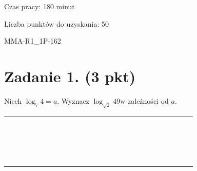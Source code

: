 \documentclass[10pt]{article}
\begin{document}
Czas pracy: 180 minut

Liczba punktów do uzyskania: 50

MMA-R1\_1P-162

\section*{Zadanie 1. (3 pkt)}
Niech \(\log _{7} 4=a\). Wyznacz \(\log _{\sqrt{2}} 49 \mathrm{w}\) zależności od \(a\).

\begin{center}
\begin{tabular}{|c|c|c|c|c|c|c|c|c|c|c|c|c|c|c|c|c|c|c|c|c|c|c|}
\hline
 &  &  &  &  &  &  &  &  &  &  &  &  &  &  &  &  &  &  &  &  &  &  \\
\hline
 &  &  &  &  &  &  &  &  &  &  &  &  &  &  &  &  &  &  &  &  &  &  \\
\hline
 &  &  &  &  &  &  &  &  &  &  &  &  &  &  &  &  &  &  &  &  &  &  \\
\hline
 &  &  &  &  &  &  &  &  &  &  &  &  &  &  &  &  &  &  &  &  &  &  \\
\hline
 &  &  &  &  &  &  &  &  &  &  &  &  &  &  &  &  &  &  &  &  &  &  \\
\hline
 &  &  &  &  &  &  &  &  &  &  &  &  &  &  &  &  &  &  &  &  &  &  \\
\hline
 &  &  &  &  &  &  &  &  &  &  &  &  &  &  &  &  &  &  &  &  &  &  \\
\hline
 &  &  &  &  &  &  &  &  &  &  &  &  &  &  &  &  &  &  &  &  &  &  \\
\hline
 &  &  &  &  &  &  &  &  &  &  &  &  &  &  &  &  &  &  &  &  &  &  \\
\hline
 &  &  &  &  &  &  &  &  &  &  &  &  &  &  &  &  &  &  &  &  &  &  \\
\hline
 &  &  &  &  &  &  &  &  &  &  &  &  &  &  &  &  &  &  &  &  &  &  \\
\hline
 &  &  &  &  &  &  &  &  &  &  &  &  &  &  &  &  &  &  &  &  &  &  \\
\hline
 &  &  &  &  &  &  &  &  &  &  &  &  &  &  &  &  &  &  &  &  &  &  \\
\hline
 &  &  &  &  &  &  &  &  &  &  &  &  &  &  &  &  &  &  &  &  &  &  \\
\hline
 &  &  &  &  &  &  &  &  &  &  &  &  &  &  &  &  &  &  &  &  &  &  \\
\hline
 &  &  &  &  &  &  &  &  &  &  &  &  &  &  &  &  &  &  &  &  &  &  \\
\hline
 &  &  &  &  &  &  &  &  &  &  &  &  &  &  &  &  &  &  &  &  &  &  \\

\end{tabular}
\end{center}
\end{document}
